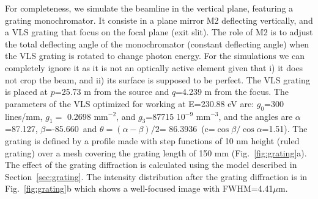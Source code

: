 \documentclass[preprint]{iucr}              %
\begin{document}
For completeness, we simulate the beamline in the vertical plane, featuring a grating monochromator. It consiste in a plane mirror M2 deflecting vertically, and a VLS grating that focus on the focal plane (exit slit). The role of M2 is to adjust the total deflecting angle of the monochromator (constant deflecting angle) when the VLS grating is rotated to change photon energy. For the simulations we can completely ignore it as it is not an optically active element given that i) it does not crop the beam, and ii) its surface is supposed to be perfect. The VLS grating is placed at $p$=25.73 m from the source and $q$=4.239 m from the focus. The parameters of the VLS optimized for working at E=230.88 eV are: $g_0$=300 lines/mm, $g_1=$  0.2698 mm$^{-2}$, and $g_3$=87715 10${^{-9}}$ mm$^{-3}$, and the angles are $\alpha$=87.127\textdegree, $\beta$=-85.660\textdegree ~and $\theta=(\alpha-\beta)/2$= 86.3936\textdegree ~(c=$\cos \beta / \cos \alpha$=1.51). The grating is defined by a profile made with step functions of 10 nm height (ruled grating) over a mesh covering the grating length of 150 mm (Fig.~\ref{fig:grating}a). The effect of the grating diffraction is calculated using the model described in Section~\ref{sec:grating}. The intensity distribution after the grating diffraction is in Fig.~\ref{fig:grating}b which shows a well-focused image with FWHM=4.41$\mu$m.
\end{document}
